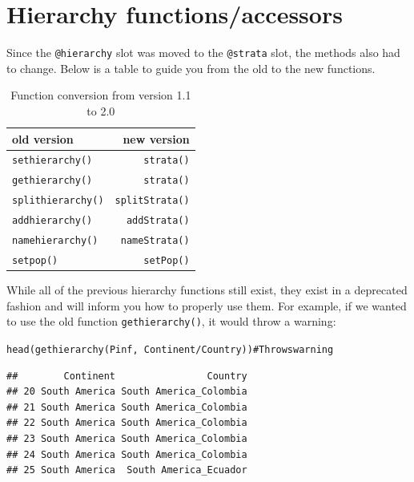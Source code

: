 \documentclass[letterpaper]{article}\usepackage[]{graphicx}\usepackage[]{color}
\makeatletter
\newcommand{\hlcom}[1]{\textcolor[rgb]{0.576,0.631,0.631}{#1}}%
\newcommand{\hlopt}[1]{\textcolor[rgb]{0.345,0.431,0.459}{#1}}%
\newcommand{\hlstd}[1]{\textcolor[rgb]{0.396,0.482,0.514}{#1}}%
\newcommand{\hlkwd}[1]{\textcolor[rgb]{0.345,0.431,0.459}{#1}}%
\newenvironment{kframe}{%
 \def\at@end@of@kframe{}%
 \ifinner\ifhmode%
  \def\at@end@of@kframe{\end{minipage}}%
  \begin{minipage}{\columnwidth}%
 \fi\fi%
 \def\FrameCommand##1{\hskip\@totalleftmargin \hskip-\fboxsep
 \colorbox{shadecolor}{##1}\hskip-\fboxsep
     \hskip-\linewidth \hskip-\@totalleftmargin \hskip\columnwidth}%
 \MakeFramed {\advance\hsize-\width
   \@totalleftmargin\z@ \linewidth\hsize
   \@setminipage}}%
 {\par\unskip\endMakeFramed%
 \at@end@of@kframe}
\newenvironment{knitrout}{}{} %
\makeatother
\begin{document}
\section{Hierarchy functions/accessors}

Since the \texttt{@hierarchy} slot was moved to the \texttt{@strata} slot, the
methods also had to change. Below is a table to guide you from the old to the 
new functions. 

\begin{table}[h]
\centering
\label{stratatable}
\begin{tabular}{lr}
\textbf{old version} & \textbf{new version} \\ \hline
\texttt{sethierarchy()} & \texttt{strata()} \\ 
\texttt{gethierarchy()} & \texttt{strata()} \\ 
\texttt{splithierarchy()} & \texttt{splitStrata()} \\ 
\texttt{addhierarchy()} & \texttt{addStrata()} \\ 
\texttt{namehierarchy()} & \texttt{nameStrata()} \\ 
\texttt{setpop()} & \texttt{setPop()} \\ \hline
\end{tabular}
\caption{Function conversion from version 1.1 to 2.0}
\end{table}

While all of the previous hierarchy functions still exist, they exist in a 
deprecated fashion and will inform you how to properly use them. For example,
if we wanted to use the old function \texttt{gethierarchy()}, it would throw a 
warning:



\begin{knitrout}
\color{fgcolor}\begin{kframe}
\begin{alltt}
\hlkwd{head}\hlstd{(}\hlkwd{gethierarchy}\hlstd{(Pinf,} \hlopt{~}\hlstd{Continent}\hlopt{/}\hlstd{Country))} \hlcom{# Throws warning}
\end{alltt}


{\ttfamily\noindent{}}\begin{verbatim}
##        Continent                Country
## 20 South America South America_Colombia
## 21 South America South America_Colombia
## 22 South America South America_Colombia
## 23 South America South America_Colombia
## 24 South America South America_Colombia
## 25 South America  South America_Ecuador
\end{verbatim}
\end{kframe}
\end{knitrout}
\end{document}
